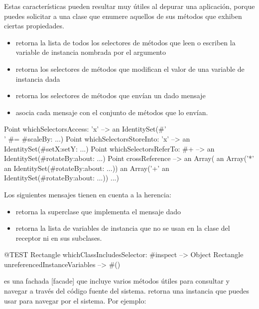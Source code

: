 \documentclass[a4paper,10pt,twoside]{book}
\begin{document}
Estas caracter\'isticas pueden resultar muy \'utiles al depurar una
aplicaci\'on, porque puedes solicitar a una clase que enumere aquellos
de sus m\'etodos que exhiben ciertas propiedades.
\begin{itemize}
\item {} retorna la lista de
  todos los selectores de m\'etodos que leen o escriben la variable de
  instancia nombrada por el argumento
\item {} retorna los
  selectores de m\'etodos que modifican el valor de una variable de
  instancia dada
\item {} retorna los selectores
  de m\'etodos que env\'ian un dado mensaje
\item {} asocia cada mensaje con el
  conjunto de m\'etodos que lo env\'ian.
\end{itemize}

\begin{code}{} %
Point whichSelectorsAccess: 'x'    --> an IdentitySet(#'\\' #= #scaleBy: ...)
Point whichSelectorsStoreInto: 'x' --> an IdentitySet(#setX:setY: ...)
Point whichSelectorsReferTo: #+  --> an IdentitySet(#rotateBy:about: ...)
Point crossReference --> an Array(
                an Array('*' an IdentitySet(#rotateBy:about: ...))
                an Array('+' an IdentitySet(#rotateBy:about: ...))
                ...)
\end{code}

Los siguientes mensajes tienen en cuenta a la herencia:

\begin{itemize}
\item {} retorna la
  superclase que implementa el mensaje dado
\item {} retorna la
  lista de variables de instancia que no se usan en la clase del
  receptor ni en sus subclases.
\end{itemize}

\begin{code}{@TEST}
Rectangle whichClassIncludesSelector: #inspect --> Object
Rectangle unreferencedInstanceVariables            --> #()
\end{code}

 es una fachada [facade] que incluye varios
m\'etodos \'utiles para consultar y navegar a trav\'es del c\'odigo fuente del
sistema.    retorna una instancia que puedes usar para navegar
por el sistema.  Por ejemplo:
\end{document}
